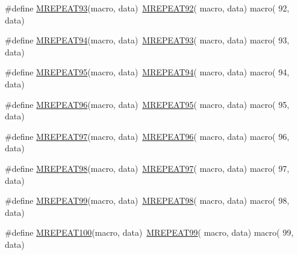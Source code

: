 \begin{DoxyCompactItemize}
\item 
\#define \mbox{\hyperlink{group__group__sam0__utils__mrepeat_gaa8143ea25cb446fb9e5afa4f79a7fbd8}{M\+R\+E\+P\+E\+A\+T93}}(macro,  data)~\mbox{\hyperlink{group__group__sam0__utils__mrepeat_gad0cb974b5c2b9677a0127be09057faaf}{M\+R\+E\+P\+E\+A\+T92}}( macro, data)   macro( 92, data)
\item 
\#define \mbox{\hyperlink{group__group__sam0__utils__mrepeat_ga44f7fcb2a7286d5d105c9d25f400aec2}{M\+R\+E\+P\+E\+A\+T94}}(macro,  data)~\mbox{\hyperlink{group__group__sam0__utils__mrepeat_gaa8143ea25cb446fb9e5afa4f79a7fbd8}{M\+R\+E\+P\+E\+A\+T93}}( macro, data)   macro( 93, data)
\item 
\#define \mbox{\hyperlink{group__group__sam0__utils__mrepeat_ga40aa5234382c6c5f3f60df82c0dbaa40}{M\+R\+E\+P\+E\+A\+T95}}(macro,  data)~\mbox{\hyperlink{group__group__sam0__utils__mrepeat_ga44f7fcb2a7286d5d105c9d25f400aec2}{M\+R\+E\+P\+E\+A\+T94}}( macro, data)   macro( 94, data)
\item 
\#define \mbox{\hyperlink{group__group__sam0__utils__mrepeat_ga0b773eb3863eaca9403e8db99a4073e6}{M\+R\+E\+P\+E\+A\+T96}}(macro,  data)~\mbox{\hyperlink{group__group__sam0__utils__mrepeat_ga40aa5234382c6c5f3f60df82c0dbaa40}{M\+R\+E\+P\+E\+A\+T95}}( macro, data)   macro( 95, data)
\item 
\#define \mbox{\hyperlink{group__group__sam0__utils__mrepeat_ga657eb71671586947acb4f1d9eea4ad80}{M\+R\+E\+P\+E\+A\+T97}}(macro,  data)~\mbox{\hyperlink{group__group__sam0__utils__mrepeat_ga0b773eb3863eaca9403e8db99a4073e6}{M\+R\+E\+P\+E\+A\+T96}}( macro, data)   macro( 96, data)
\item 
\#define \mbox{\hyperlink{group__group__sam0__utils__mrepeat_ga5488749314737100b1d663aecd83026c}{M\+R\+E\+P\+E\+A\+T98}}(macro,  data)~\mbox{\hyperlink{group__group__sam0__utils__mrepeat_ga657eb71671586947acb4f1d9eea4ad80}{M\+R\+E\+P\+E\+A\+T97}}( macro, data)   macro( 97, data)
\item 
\#define \mbox{\hyperlink{group__group__sam0__utils__mrepeat_ga6f0bcd4130a9efc978ec43537d0ccb57}{M\+R\+E\+P\+E\+A\+T99}}(macro,  data)~\mbox{\hyperlink{group__group__sam0__utils__mrepeat_ga5488749314737100b1d663aecd83026c}{M\+R\+E\+P\+E\+A\+T98}}( macro, data)   macro( 98, data)
\item 
\#define \mbox{\hyperlink{group__group__sam0__utils__mrepeat_ga2735125552e869ea1e49fa52ed6e175c}{M\+R\+E\+P\+E\+A\+T100}}(macro,  data)~\mbox{\hyperlink{group__group__sam0__utils__mrepeat_ga6f0bcd4130a9efc978ec43537d0ccb57}{M\+R\+E\+P\+E\+A\+T99}}( macro, data)   macro( 99, data)

\end{DoxyCompactItemize}
